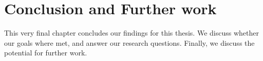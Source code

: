 \chapter{Conclusion and Further work}
\label{chap:conclusion}

This very final chapter concludes our findings for this thesis. We discuss whether our goals where met, and answer our research questions. Finally, we discuss the potential for further work. 




